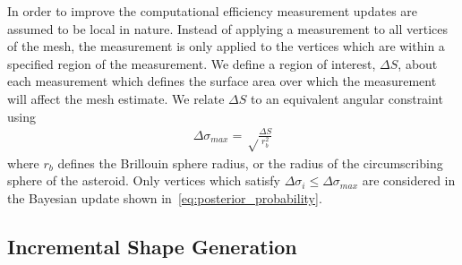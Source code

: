 In order to improve the computational efficiency measurement updates are assumed to be local in nature.
Instead of applying a measurement to all vertices of the mesh, the measurement is only applied to the vertices which are within a specified region of the measurement. 
We define a region of interest, \( \Delta S \), about each measurement which defines the surface area over which the measurement will affect the mesh estimate.
We relate \( \Delta S \) to an equivalent angular constraint using
\begin{align}\label{eq:region_of_interest}
    \Delta \sigma_{max} = \sqrt \frac{\Delta S}{r_b^2}
\end{align}
where \( r_b \) defines the Brillouin  sphere radius, or the radius of the circumscribing sphere of the asteroid.
Only vertices which satisfy \( \Delta \sigma_i \leq \Delta \sigma_{max} \) are considered in the Bayesian update shown in~\cref{eq:posterior_probability}.

\subsection{Incremental Shape Generation}

